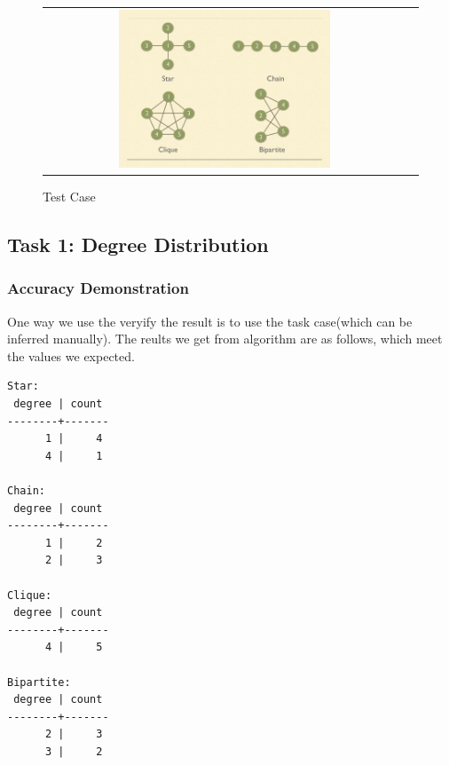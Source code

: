  \begin{figure}[htbf]
\begin{center}
\begin{tabular}{cc}
     \includegraphics[width=0.6\textwidth]{FIG/testcase.jpg} \\
\end{tabular}
\caption{Test Case}
\label{fig:testcase}
\end{center}
\end{figure}


\subsection{Task 1: Degree Distribution}
\subsubsection{Accuracy Demonstration}
One way we use the veryify the result is to use the task case(which can be inferred manually). The reults we get from algorithm are as follows, which meet the values we expected.
\begin{verbatim}
Star:
 degree | count 
--------+-------
      1 |     4
      4 |     1

Chain:
 degree | count 
--------+-------
      1 |     2
      2 |     3

Clique:
 degree | count 
--------+-------
      4 |     5

Bipartite:
 degree | count 
--------+-------
      2 |     3
      3 |     2
\end{verbatim}

